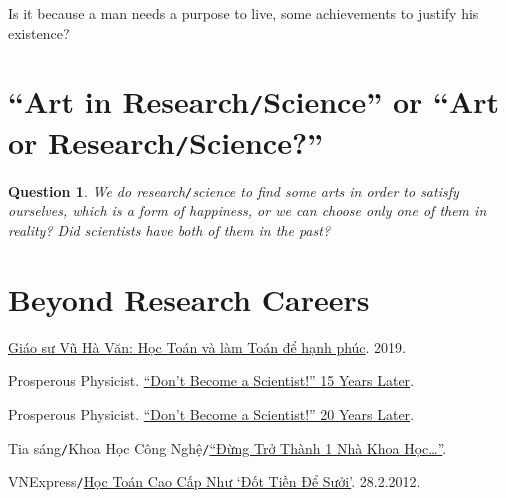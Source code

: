 \documentclass{article}
\numberwithin{equation}{section}
\newtheorem{ques}{Question}[section]
\begin{document}
Is it because a man needs a purpose to live, some achievements to justify his existence?

\section{``Art in Research\texttt{/}Science'' or ``Art or Research\texttt{/}Science?''}
\begin{ques}
	We do research\texttt{/}science to find some arts in order to satisfy ourselves, which is a form of happiness, or we can choose only one of them in reality? Did scientists have both of them in the past?
\end{ques}

\section{Beyond Research Careers}


\begin{thebibliography}{99}
	 \href{https://www.mathvn.com/2019/03/giao-su-vu-ha-van-hoc-toan-va-lam-toan.html}{Giáo sư Vũ Hà Văn: Học Toán và làm Toán để hạnh phúc}. 2019.
	
	 Prosperous Physicist. \href{https://www.prosperousphysicist.com/dont-become-a-scientist-15-years-later/}{``Don't Become a Scientist!'' 15 Years Later}.
	
	 Prosperous Physicist. \href{http://www.prosperousphysicist.com/dont-become-a-scientist-20-years-later/}{``Don't Become a Scientist!'' 20 Years Later}.
	
	 Tia sáng\texttt{/}Khoa Học Công Nghệ\texttt{/}\href{https://tiasang.com.vn/khoa-hoc-cong-nghe/dung-tro-thanh-mot-nha-khoa-hoc-903}{``Đừng Trở Thành 1 Nhà Khoa Học\ldots''}.
	
	 VNExpress\texttt{/}\href{https://vnexpress.net/hoc-toan-cao-cap-nhu-dot-tien-de-suoi-2223794.html}{Học Toán Cao Cấp Như `Đốt Tiền Để Sưởi'}. 28.2.2012.
\end{thebibliography}
\end{document}
